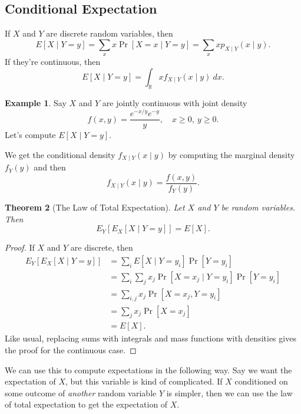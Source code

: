\documentclass[12pt]{article}
\theoremstyle{plain}
\newtheorem{theorem}{Theorem}[section]
\theoremstyle{definition}
\newtheorem{example}[theorem]{Example}
\theoremstyle{remark}
\newcommand{\R}{\mathbb{R}}
\begin{document}
\subsection{Conditional Expectation}
If $X$ and $Y$ are discrete random variables, then
\[
E[X\mid Y = y] = \sum _x x \Pr[X = x\mid Y = y] = \sum_x x p_{X\mid Y}(x\mid y).
\]
If they're continuous, then
\[
    E[X\mid Y = y] = \int_\R xf_{X\mid Y}(x\mid y)\ dx.
\]

\begin{example}
    Say $X$ and $Y$ are jointly continuous with joint density
    \[
        f(x,y) = \frac{e^{-x/y}e^{-y}}{y},\quad x\geq 0,\ y\geq 0.
    \]
    Let's compute $E[X\mid Y = y]$.

    We get the conditional density $f_{X\mid Y}(x\mid y)$ by computing the marginal density $f_Y(y)$ and then
    \[
        f_{X\mid Y}(x\mid y) = \frac{f(x,y)}{f_Y(y)}.
    \]
\end{example}


\begin{theorem}[The Law of Total Expectation]
Let $X$ and $Y$ be random variables.
Then
\[
    E_Y[E_X[X\mid Y = y]] = E[X].
\]
\end{theorem}
\begin{proof}
    If $X$ and $Y$ are discrete, then
    \begin{align*}
        E_Y[E_X[X\mid Y = y]] &= \sum_iE[X\mid Y = y_i]\Pr[Y = y_i]\\
        &= \sum_i\sum_jx_j\Pr[X = x_j\mid Y = y_i]\Pr[Y = y_i]\\
        &= \sum_{i,j} x_j \Pr[X = x_j, Y = y_i]\\
        &= \sum_j x_j\Pr[X = x_j]\\
        &= E[X].
    \end{align*}
    Like usual, replacing sums with integrals and mass functions with densities gives the proof for the continuous case.
\end{proof}

We can use this to compute expectations in the following way.
Say we want the expectation of $X$, but this variable is kind of complicated.
If $X$ conditioned on some outcome of \emph{another} random variable $Y$ is simpler, then we can use the law of total expectation to get the expectation of $X$.
\end{document}
